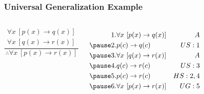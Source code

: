 \documentclass[dvipsnames]{beamer}
\begin{document}
\begin{frame}
  \frametitle{Universal Generalization Example}

  \begin{example}
    \begin{columns}
      \[
      \frac
        {
          \begin{array}{c}
            \forall x~[p(x) \rightarrow q(x)]\\
            \forall x~[q(x) \rightarrow r(x)]
          \end{array}
        }
        {
          \therefore \forall x~[p(x) \rightarrow r(x)]
        }
      \]

      \pause
      \begin{eqnarray*}
        1. & \forall x~[p(x) \rightarrow q(x)] & A\\\pause
        2. & p(c) \rightarrow q(c)             & US:1\\\pause
        3. & \forall x~[q(x) \rightarrow r(x)] & A\\\pause
        4. & q(c) \rightarrow r(c)             & US:3\\\pause
        5. & p(c) \rightarrow r(c)             & HS:2,4\\\pause
        6. & \forall x~[p(x) \rightarrow r(x)] & UG:5
      \end{eqnarray*}
    \end{columns}
  \end{example}
\end{frame}
%
%
%
%
%
%
\end{document}

